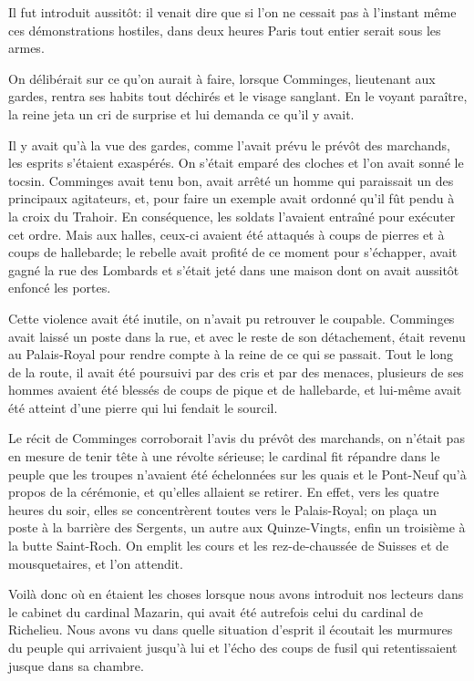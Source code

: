 Il fut introduit aussitôt: il venait dire que si l'on ne cessait pas à l'instant même ces démonstrations hostiles, dans deux heures Paris tout entier serait sous les armes.

On délibérait sur ce qu'on aurait à faire, lorsque Comminges, lieutenant aux gardes, rentra ses habits tout déchirés et le visage sanglant. En le voyant paraître, la reine jeta un cri de surprise et lui demanda ce qu'il y avait.

Il y avait qu'à la vue des gardes, comme l'avait prévu le prévôt des marchands, les esprits s'étaient exaspérés. On s'était emparé des cloches et l'on avait sonné le tocsin. Comminges avait tenu bon, avait arrêté un homme qui paraissait un des principaux agitateurs, et, pour faire un exemple avait ordonné qu'il fût pendu à la croix du Trahoir. En conséquence, les soldats l'avaient entraîné pour exécuter cet ordre. Mais aux halles, ceux-ci avaient été attaqués à coups de pierres et à coups de hallebarde; le rebelle avait profité de ce moment pour s'échapper, avait gagné la rue des Lombards et s'était jeté dans une maison dont on avait aussitôt enfoncé les portes.

Cette violence avait été inutile, on n'avait pu retrouver le coupable. Comminges avait laissé un poste dans la rue, et avec le reste de son détachement, était revenu au Palais-Royal pour rendre compte à la reine de ce qui se passait. Tout le long de la route, il avait été poursuivi par des cris et par des menaces, plusieurs de ses hommes avaient été blessés de coups de pique et de hallebarde, et lui-même avait été atteint d'une pierre qui lui fendait le sourcil.

Le récit de Comminges corroborait l'avis du prévôt des marchands, on n'était pas en mesure de tenir tête à une révolte sérieuse; le cardinal fit répandre dans le peuple que les troupes n'avaient été échelonnées sur les quais et le Pont-Neuf qu'à propos de la cérémonie, et qu'elles allaient se retirer. En effet, vers les quatre heures du soir, elles se concentrèrent toutes vers le Palais-Royal; on plaça un poste à la barrière des Sergents, un autre aux Quinze-Vingts, enfin un troisième à la butte Saint-Roch. On emplit les cours et les rez-de-chaussée de Suisses et de mousquetaires, et l'on attendit.

Voilà donc où en étaient les choses lorsque nous avons introduit nos lecteurs dans le cabinet du cardinal Mazarin, qui avait été autrefois celui du cardinal de Richelieu. Nous avons vu dans quelle situation d'esprit il écoutait les murmures du peuple qui arrivaient jusqu'à lui et l'écho des coups de fusil qui retentissaient jusque dans sa chambre.

